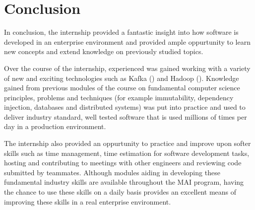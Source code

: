 \chapter{Conclusion}
In conclusion, the internship provided a fantastic insight into how software is developed in an enterprise environment and provided ample oppurtunity to learn new concepts and extend knowledge on previously studied topics. 

Over the course of the internship, experienced was gained working with a variety of new and exciting technologies such as Kafka () and Hadoop (). Knowledge gained from previous modules of the course on fundamental computer science principles, problems and techniques (for example immutability, dependency injection, databases and distributed systems) was put into practice and used to deliver industry standard, well tested software that is used millions of times per day in a production environment.

The internship also provided an oppurtunity to practice and improve upon softer skills such as time management, time estimation for software development tasks, hosting and contributing to meetings with other engineers and reviewing code submitted by teammates. Although modules aiding in developing these fundamental industry skills are available throughout the MAI program, having the chance to use these skills on a daily basis provides an excellent means of improving these skills in a real enterprise environment.
